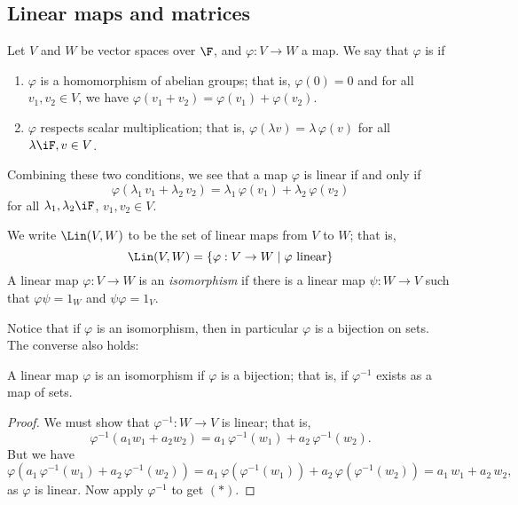 	\pagebreak

\subsection{Linear maps and matrices} %
\label{sub:linear_maps_and_matrices}

\begin{definition}
	Let $V$ and $W$ be vector spaces over $\F$, and $\varphi:V\to W$ a map. We say that $\varphi$ is  if %
	\begin{enumerate}
		\shortskip
		\item $\varphi$ is a homomorphism of abelian groups; that is, $\varphi(0)=0$ and for all $v_1,v_2\in V$, we have $\varphi(v_1+v_2) = \varphi(v_1) + \varphi(v_2)$. %
		\item $\varphi$ respects scalar multiplication; that is, $\varphi(\lambda v) = \lambda\,\varphi(v)$ for all $\lambda\iF, v\in V$. %
	\end{enumerate}
\end{definition}

Combining these two conditions, we see that a map $\varphi$ is linear if and only if
\begin{equation*}
	\varphi(\lambda_1 \, v_1+\lambda_2 \, v_2)=\lambda_1\,\varphi(v_1)+\lambda_2\,\varphi(v_2) %
\end{equation*}
for all $\lambda_1,\lambda_2\iF$, $v_1,v_2\in V$.

\begin{definition}
	We write $\Lin(V,W)$ to be the set of linear maps from $V$ to $W$; that is,
	\begin{equation*}
		\Lin(V,W)=\left\{\varphi:V\to W \mid \varphi \text{ linear}\right\}
	\end{equation*}
	A linear map $\varphi:V\to W$ is an \emph{isomorphism} if there is a linear map $\psi:W\to V$ such that $\varphi\psi=1_W$ and $\psi\varphi=1_V$.
\end{definition}

Notice that if $\varphi$ is an isomorphism, then in particular $\varphi$ is a bijection on sets. The converse also holds:

\begin{lemma}
	A linear map $\varphi$ is an isomorphism if $\varphi$ is a bijection; that is, if $\varphi^{-1}$ exists as a map of sets. %
\end{lemma}

\begin{proof}
	We must show that $\varphi^{-1}:W\to V$ is linear; that is, %
	\begin{equation*}
		\varphi^{-1}(a_1 w_1 + a_2 w_2) = a_1\,\varphi^{-1}(w_1) + a_2\,\varphi^{-1}(w_2). %
		\tag{$*$}
	\end{equation*}
	But we have
	\begin{equation*}
		\varphi\left( a_1\,\varphi^{-1}(w_1) + a_2\,\varphi^{-1}(w_2) \right)
		= a_1\, \varphi(\varphi^{-1}(w_1)) + a_2\,\varphi(\varphi^{-1}(w_2))
		= a_1\,w_1 + a_2\,w_2, %
	\end{equation*}
	as $\varphi$ is linear. Now apply $\varphi^{-1}$ to get $(*)$.
\end{proof}

